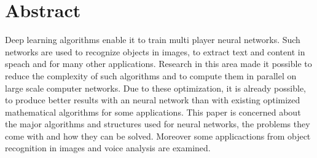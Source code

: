 \chapter{Abstract}

\begin{english} %
Deep learning algorithms enable it to train multi player neural networks. Such networks are used to recognize objects in images, to extract text and content in speach and for many other applications. Research in this area made it possible to reduce the complexity of such algorithms and to compute them in parallel on large scale computer networks. Due to these optimization, it is already possible, to produce better results with an neural network than with existing optimized mathematical algorithms for some applications. This paper is concerned about the major algorithms and structures used for neural networks, the problems they come with and how they can be solved. Moreover some applicactions from object recognition in images and voice analysis are examined.
\end{english}